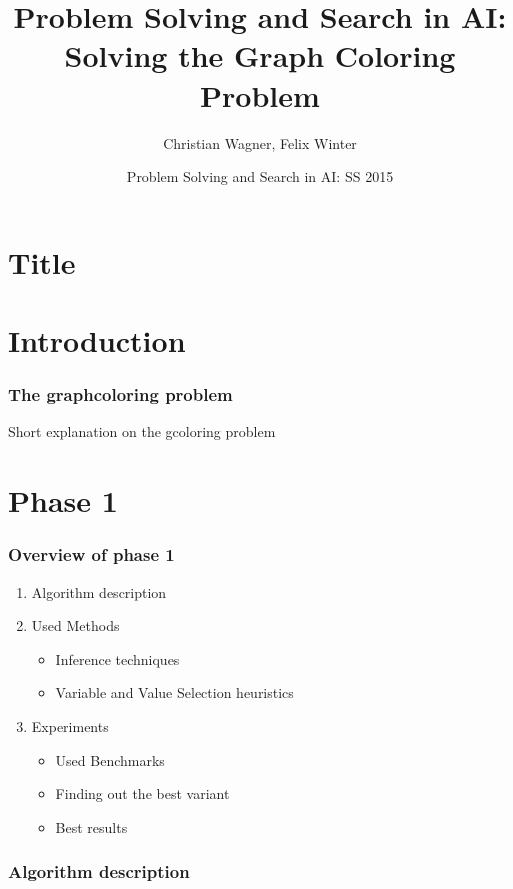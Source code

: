 \documentclass{beamer}
\title[Solving the Graph Coloring Problem] %
{Problem Solving and Search in AI: Solving the Graph Coloring
Problem}
\author{Christian Wagner, Felix Winter}
\institute
{
  TU Wien  
}
\date[SS 2015] %
{Problem Solving and Search in AI: SS 2015}
\begin{document}
\section{Title}
  \frame{\titlepage}


\section{Introduction}

\begin{frame}
  \frametitle{The graphcoloring problem}


  Short explanation on the gcoloring problem
  \end{frame}


\section{Phase 1}
  \begin{frame}
    \frametitle{Overview of phase 1}

    \begin{enumerate}
      \item Algorithm description
      \item Used Methods
        \begin{itemize}
        \item{Inference techniques}
        \item{Variable and Value Selection heuristics}
        \end{itemize}
        
      \item{Experiments}
        \begin{itemize}
        \item{Used Benchmarks}
        \item{Finding out the best variant}
        \item{Best results}
        \end{itemize}

    \end{enumerate}
  \end{frame}


  \begin{frame}
    \frametitle{Algorithm description}


  \end{frame}

  
\end{document}
